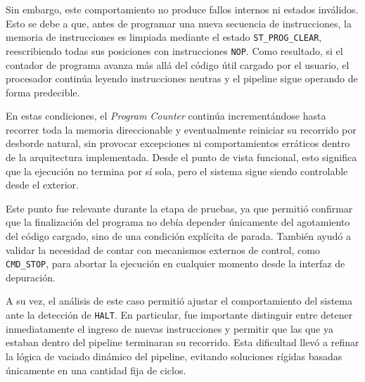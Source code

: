 Sin embargo, este comportamiento no produce fallos internos ni estados inválidos. Esto se debe a que, antes de programar una nueva secuencia de instrucciones, la memoria de instrucciones es limpiada mediante el estado \texttt{ST\_PROG\_CLEAR}, reescribiendo todas sus posiciones con instrucciones \texttt{NOP}. Como resultado, si el contador de programa avanza más allá del código útil cargado por el usuario, el procesador continúa leyendo instrucciones neutras y el pipeline sigue operando de forma predecible.

En estas condiciones, el \textit{Program Counter} continúa incrementándose hasta recorrer toda la memoria direccionable y eventualmente reiniciar su recorrido por desborde natural, sin provocar excepciones ni comportamientos erráticos dentro de la arquitectura implementada. Desde el punto de vista funcional, esto significa que la ejecución no termina por sí sola, pero el sistema sigue siendo controlable desde el exterior.

Este punto fue relevante durante la etapa de pruebas, ya que permitió confirmar que la finalización del programa no debía depender únicamente del agotamiento del código cargado, sino de una condición explícita de parada. También ayudó a validar la necesidad de contar con mecanismos externos de control, como \texttt{CMD\_STOP}, para abortar la ejecución en cualquier momento desde la interfaz de depuración.

A su vez, el análisis de este caso permitió ajustar el comportamiento del sistema ante la detección de \texttt{HALT}. En particular, fue importante distinguir entre detener inmediatamente el ingreso de nuevas instrucciones y permitir que las que ya estaban dentro del pipeline terminaran su recorrido. Esta dificultad llevó a refinar la lógica de vaciado dinámico del pipeline, evitando soluciones rígidas basadas únicamente en una cantidad fija de ciclos.
